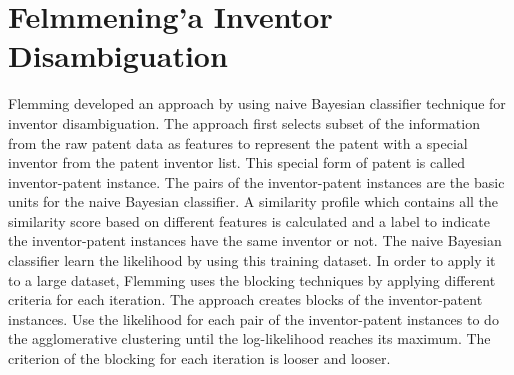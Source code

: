 \section{Felmmening'a Inventor Disambiguation}
Flemming developed an approach by using naive Bayesian classifier technique for inventor disambiguation. The approach first selects subset of the information from the raw patent data as features to represent the patent with a special inventor from the patent inventor list. This special form of patent is called inventor-patent instance. The pairs of the inventor-patent instances are the basic units for the naive Bayesian classifier. A similarity profile which contains all the similarity score based on different features is calculated and a label to indicate the inventor-patent instances have the same inventor or not. The naive Bayesian classifier learn the likelihood by using this training dataset. In order to apply it to a large dataset, Flemming uses the blocking techniques by applying different criteria for each iteration. The approach creates blocks of the inventor-patent instances. Use the likelihood for each pair of the inventor-patent instances to do the agglomerative clustering until the log-likelihood reaches its maximum. The criterion of the blocking for each iteration is looser and looser. 


